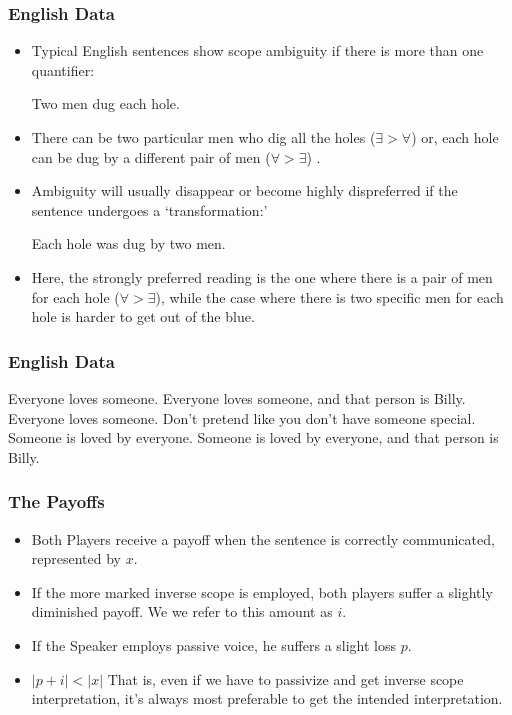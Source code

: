 \documentclass[aspectratio=1610]{beamer}
\begin{document}
\begin{frame}
\frametitle{English Data}\pause
\begin{itemize}
\item Typical English sentences show scope ambiguity if there is more than one quantifier:\pause
\begin{exe}
\ex Two men dug each hole.
\end{exe}\pause
\item There can be two particular men who dig all the holes ($\exists>\forall$)  or, each hole can be dug by a different pair of men ($\forall>\exists$) .\pause
\item Ambiguity will usually disappear or become highly dispreferred if the sentence undergoes a `transformation:'\pause
\begin{exe}
\ex Each hole was dug by two men.
\end{exe}\pause
\item Here, the strongly preferred reading is the one where there is a pair of men for each hole ($\forall>\exists$), while the case where there is two specific men for each hole is harder to get out of the blue.
\end{itemize}
\end{frame}

\begin{frame}
\frametitle{English Data}\pause
\begin{exe}
\ex Everyone loves someone.\pause
\ex Everyone loves someone, and that person is Billy.\pause
\ex Everyone loves someone. Don't pretend like you don't have someone special.\pause
\ex Someone is loved by everyone.\pause
\ex Someone is loved by everyone, and that person is Billy.\pause
{}
\end{exe}
\end{frame}

\begin{frame}
	\frametitle{The Payoffs}\pause

	\begin{itemize}
		\item Both Players receive a payoff when the sentence is correctly communicated, represented by $x$.\pause
		\item If the more marked inverse scope is employed, both players suffer a slightly diminished payoff. We we refer to this amount as $i$.\pause
		\item If the Speaker employs passive voice, he suffers a slight loss $p$.\pause
		\item $|p+i|<|x|$ That is, even if we have to passivize and get inverse scope interpretation, it's always most preferable to get the intended interpretation.
	\end{itemize}

\end{frame}
\end{document}
